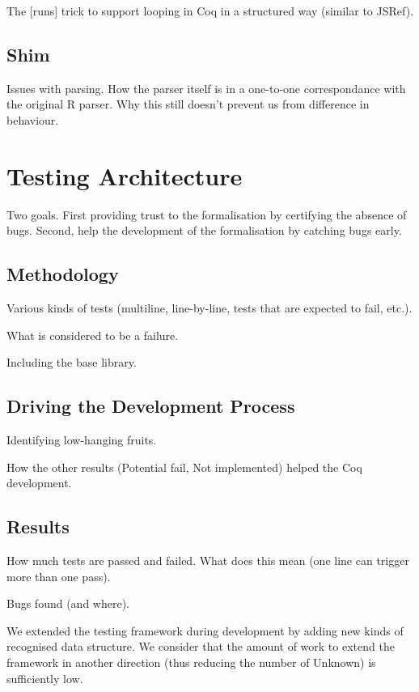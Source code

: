 \documentclass[
    sigplan,
    10pt,
    review, %
    natbib=false %
 ]{acmart}
\begin{document}
The [runs] trick to support looping in Coq in a structured way (similar to JSRef).

\subsection{Shim}
\label{sec:shim}

Issues with parsing.
How the parser itself is in a one-to-one correspondance with the original R parser.
Why this still doesn’t prevent us from difference in behaviour.

\section{Testing Architecture}
\label{sec:testing:architecture}

Two goals.
First providing trust to the formalisation by certifying the absence of bugs.
Second, help the development of the formalisation by catching bugs early.

\subsection{Methodology}
\label{sec:test:methodology}

Various kinds of tests (multiline, line-by-line, tests that are expected to fail, etc.).

What is considered to be a failure.

Including the base library.

\subsection{Driving the Development Process}
\label{sec:driving:development}

Identifying low-hanging fruits.

How the other results (Potential fail, Not implemented) helped the Coq development.

\subsection{Results}
\label{sec:test:results}

How much tests are passed and failed.
What does this mean (one line can trigger more than one pass).

Bugs found (and where).

We extended the testing framework during development by adding new kinds of recognised
data structure.
We consider that the amount of work to extend the framework in another direction
(thus reducing the number of Unknown) is sufficiently low.
\end{document}
